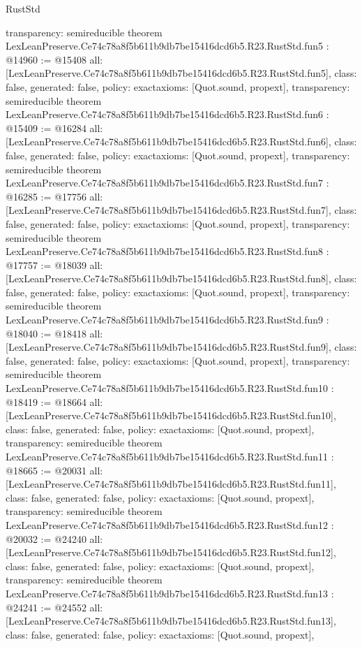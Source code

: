 \begin{lexlean}{RustStd}
\begin{coremodule}
{  transparency: semireducible
}
theorem LexLeanPreserve.Ce74c78a8f5b611b9db7be15416dcd6b5.R23.RustStd.fun5 : @14960 := @15408 {
  all: [LexLeanPreserve.Ce74c78a8f5b611b9db7be15416dcd6b5.R23.RustStd.fun5],
  class: false,
  generated: false,
  policy: exact{axioms: [Quot.sound, propext]},
  transparency: semireducible
}
theorem LexLeanPreserve.Ce74c78a8f5b611b9db7be15416dcd6b5.R23.RustStd.fun6 : @15409 := @16284 {
  all: [LexLeanPreserve.Ce74c78a8f5b611b9db7be15416dcd6b5.R23.RustStd.fun6],
  class: false,
  generated: false,
  policy: exact{axioms: [Quot.sound, propext]},
  transparency: semireducible
}
theorem LexLeanPreserve.Ce74c78a8f5b611b9db7be15416dcd6b5.R23.RustStd.fun7 : @16285 := @17756 {
  all: [LexLeanPreserve.Ce74c78a8f5b611b9db7be15416dcd6b5.R23.RustStd.fun7],
  class: false,
  generated: false,
  policy: exact{axioms: [Quot.sound, propext]},
  transparency: semireducible
}
theorem LexLeanPreserve.Ce74c78a8f5b611b9db7be15416dcd6b5.R23.RustStd.fun8 : @17757 := @18039 {
  all: [LexLeanPreserve.Ce74c78a8f5b611b9db7be15416dcd6b5.R23.RustStd.fun8],
  class: false,
  generated: false,
  policy: exact{axioms: [Quot.sound, propext]},
  transparency: semireducible
}
theorem LexLeanPreserve.Ce74c78a8f5b611b9db7be15416dcd6b5.R23.RustStd.fun9 : @18040 := @18418 {
  all: [LexLeanPreserve.Ce74c78a8f5b611b9db7be15416dcd6b5.R23.RustStd.fun9],
  class: false,
  generated: false,
  policy: exact{axioms: [Quot.sound, propext]},
  transparency: semireducible
}
theorem LexLeanPreserve.Ce74c78a8f5b611b9db7be15416dcd6b5.R23.RustStd.fun10 : @18419 := @18664 {
  all: [LexLeanPreserve.Ce74c78a8f5b611b9db7be15416dcd6b5.R23.RustStd.fun10],
  class: false,
  generated: false,
  policy: exact{axioms: [Quot.sound, propext]},
  transparency: semireducible
}
theorem LexLeanPreserve.Ce74c78a8f5b611b9db7be15416dcd6b5.R23.RustStd.fun11 : @18665 := @20031 {
  all: [LexLeanPreserve.Ce74c78a8f5b611b9db7be15416dcd6b5.R23.RustStd.fun11],
  class: false,
  generated: false,
  policy: exact{axioms: [Quot.sound, propext]},
  transparency: semireducible
}
theorem LexLeanPreserve.Ce74c78a8f5b611b9db7be15416dcd6b5.R23.RustStd.fun12 : @20032 := @24240 {
  all: [LexLeanPreserve.Ce74c78a8f5b611b9db7be15416dcd6b5.R23.RustStd.fun12],
  class: false,
  generated: false,
  policy: exact{axioms: [Quot.sound, propext]},
  transparency: semireducible
}
theorem LexLeanPreserve.Ce74c78a8f5b611b9db7be15416dcd6b5.R23.RustStd.fun13 : @24241 := @24552 {
  all: [LexLeanPreserve.Ce74c78a8f5b611b9db7be15416dcd6b5.R23.RustStd.fun13],
  class: false,
  generated: false,
  policy: exact{axioms: [Quot.sound, propext]},
}
\end{coremodule}
\end{lexlean}
